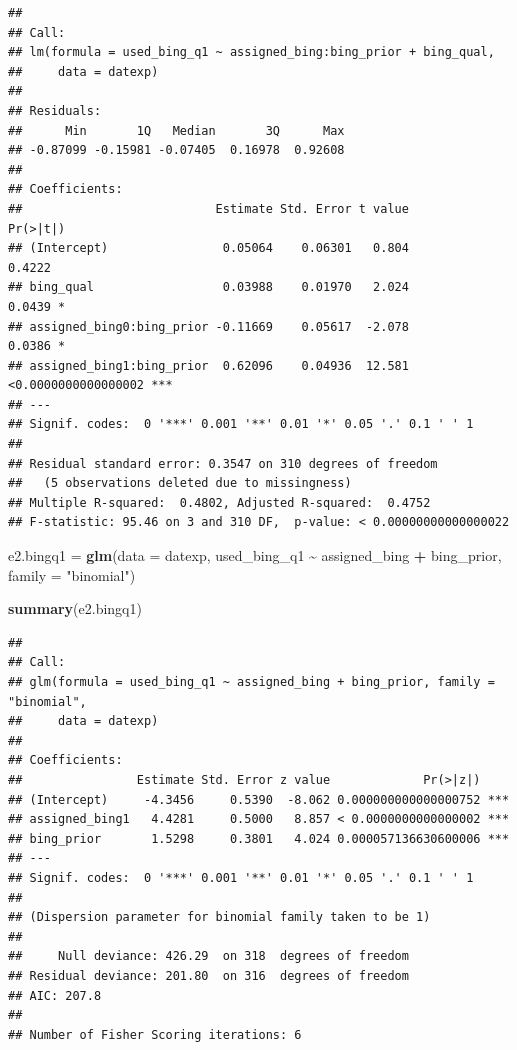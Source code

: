 \documentclass[
  11pt,
]{article}
\newenvironment{Shaded}{\begin{snugshade}}{\end{snugshade}}
\newcommand{\AttributeTok}[1]{\textcolor[rgb]{0.13,0.29,0.53}{#1}}
\newcommand{\FunctionTok}[1]{\textcolor[rgb]{0.13,0.29,0.53}{\textbf{#1}}}
\newcommand{\NormalTok}[1]{#1}
\newcommand{\OtherTok}[1]{\textcolor[rgb]{0.56,0.35,0.01}{#1}}
\newcommand{\SpecialCharTok}[1]{\textcolor[rgb]{0.81,0.36,0.00}{\textbf{#1}}}
\newcommand{\StringTok}[1]{\textcolor[rgb]{0.31,0.60,0.02}{#1}}
\begin{document}
\begin{verbatim}
## 
## Call:
## lm(formula = used_bing_q1 ~ assigned_bing:bing_prior + bing_qual, 
##     data = datexp)
## 
## Residuals:
##      Min       1Q   Median       3Q      Max 
## -0.87099 -0.15981 -0.07405  0.16978  0.92608 
## 
## Coefficients:
##                           Estimate Std. Error t value            Pr(>|t|)    
## (Intercept)                0.05064    0.06301   0.804              0.4222    
## bing_qual                  0.03988    0.01970   2.024              0.0439 *  
## assigned_bing0:bing_prior -0.11669    0.05617  -2.078              0.0386 *  
## assigned_bing1:bing_prior  0.62096    0.04936  12.581 <0.0000000000000002 ***
## ---
## Signif. codes:  0 '***' 0.001 '**' 0.01 '*' 0.05 '.' 0.1 ' ' 1
## 
## Residual standard error: 0.3547 on 310 degrees of freedom
##   (5 observations deleted due to missingness)
## Multiple R-squared:  0.4802, Adjusted R-squared:  0.4752 
## F-statistic: 95.46 on 3 and 310 DF,  p-value: < 0.00000000000000022
\end{verbatim}

\begin{Shaded}
\begin{Highlighting}[]
\NormalTok{e2.bingq1 }\OtherTok{=} \FunctionTok{glm}\NormalTok{(}\AttributeTok{data =}\NormalTok{ datexp, used\_bing\_q1 }\SpecialCharTok{\textasciitilde{}}\NormalTok{ assigned\_bing }\SpecialCharTok{+}\NormalTok{ bing\_prior, }\AttributeTok{family =} \StringTok{"binomial"}\NormalTok{)}

\FunctionTok{summary}\NormalTok{(e2.bingq1)}
\end{Highlighting}
\end{Shaded}

\begin{verbatim}
## 
## Call:
## glm(formula = used_bing_q1 ~ assigned_bing + bing_prior, family = "binomial", 
##     data = datexp)
## 
## Coefficients:
##                Estimate Std. Error z value             Pr(>|z|)    
## (Intercept)     -4.3456     0.5390  -8.062 0.000000000000000752 ***
## assigned_bing1   4.4281     0.5000   8.857 < 0.0000000000000002 ***
## bing_prior       1.5298     0.3801   4.024 0.000057136630600006 ***
## ---
## Signif. codes:  0 '***' 0.001 '**' 0.01 '*' 0.05 '.' 0.1 ' ' 1
## 
## (Dispersion parameter for binomial family taken to be 1)
## 
##     Null deviance: 426.29  on 318  degrees of freedom
## Residual deviance: 201.80  on 316  degrees of freedom
## AIC: 207.8
## 
## Number of Fisher Scoring iterations: 6
\end{verbatim}
\end{document}
